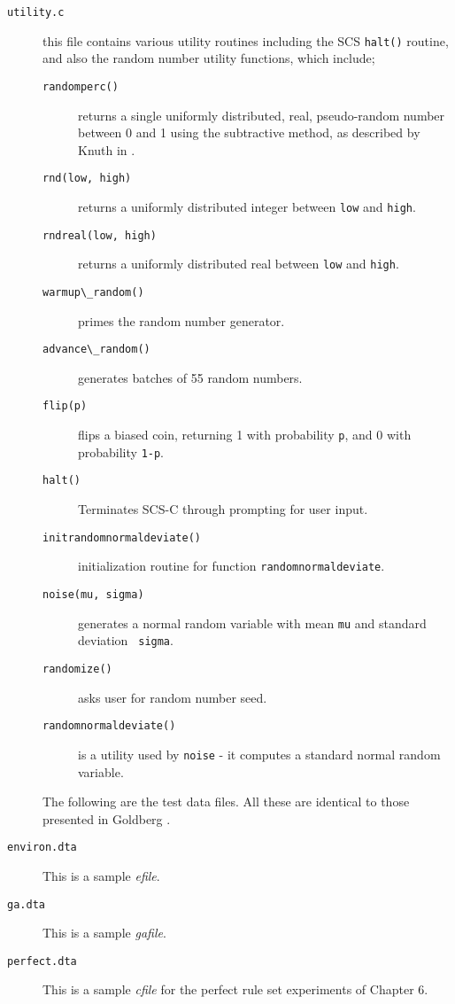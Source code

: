 \begin{description}
 

\item[\verb!utility.c!] this file contains various utility
routines including the SCS {\tt halt()} routine, and also the 
random number utility functions, which include; 



  \begin{description}
    \item[\verb!randomperc()!] returns a single uniformly
distributed, real, pseudo-random number between 0 and 1 using
the subtractive method, as described by Knuth in \cite{2}. 
    \item[\verb!rnd(low, high)!] returns a uniformly
distributed integer between {\tt low} and {\tt high}.  
    \item[\verb!rndreal(low, high)!] returns a uniformly
distributed real between {\tt low} and {\tt high}.  
    \item[\verb!warmup\_random()!] primes the random number
generator.
    \item[\verb!advance\_random()!]  generates batches of 55
random numbers.
    \item[\verb!flip(p)!] flips a biased coin, returning 1
with probability {\tt p}, and 0 with probability {\tt 1-p}. 
    \item[\verb!halt()!] Terminates SCS-C through prompting
for user input.
    \item[\verb!initrandomnormaldeviate()!] initialization
routine for function {\tt randomnormaldeviate}.
    \item[\verb!noise(mu, sigma)!] generates a normal random
variable with mean {\tt mu} and standard deviation {\tt
sigma}.  
    \item[\verb!randomize()!] asks user for random number
seed.
    \item[\verb!randomnormaldeviate()!] is a utility used by
{\tt noise} - it computes a standard normal random variable.
  \end{description}



The following are the test data files. All these are identical to
those presented in Goldberg \cite{1}.

\item[\verb!environ.dta!] This is a sample {\it efile}.

\item[\verb!ga.dta!] This is a sample {\it gafile}.

\item[\verb!perfect.dta!] This is a sample {\it cfile} for the
perfect rule set experiments of Chapter 6. 


\end{description}
